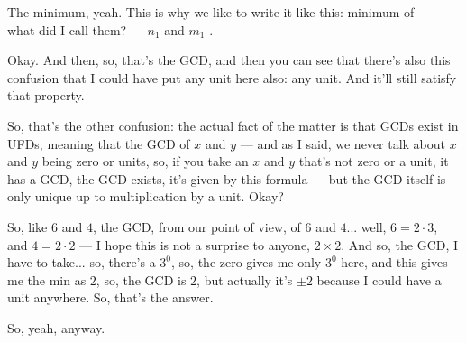 \begin{speech}[01:24:47 - 01:26:29]
The minimum, yeah. This is why we like to write it like this: minimum of --- what did I call them? --- $n_1$ and $m_1$ .

Okay. And then, so, that's the GCD, and then you can see that there's also this confusion that I could have put any unit here also:  any unit. And it'll still satisfy that property.

So, that's the other confusion: the actual fact of the matter is that GCDs exist in UFDs,  meaning that the GCD of $x$ and $y$ --- and as I said, we never talk about $x$ and $y$ being zero or units, so, if you take an $x$ and $y$ that's not zero or a unit, it has a GCD, the GCD exists, it's given by this formula --- but the GCD itself is only unique up to multiplication by a unit.  Okay?

So, like $6$ and $4$, the GCD, from our point of view, of $6$ and $4$... well, $6 = 2 \cdot 3$, and $4 = 2 \cdot 2$ --- I hope this is not a surprise to anyone, $2 \times 2$.  And so, the GCD, I have to take... so, there's a $3^0$, so, the zero gives me only $3^0$ here, and this gives me the min as $2$, so, the GCD is $2$, but actually it's $\pm 2$ because I could have a unit anywhere. So, that's the answer. 

So, yeah, anyway.
\end{speech}

